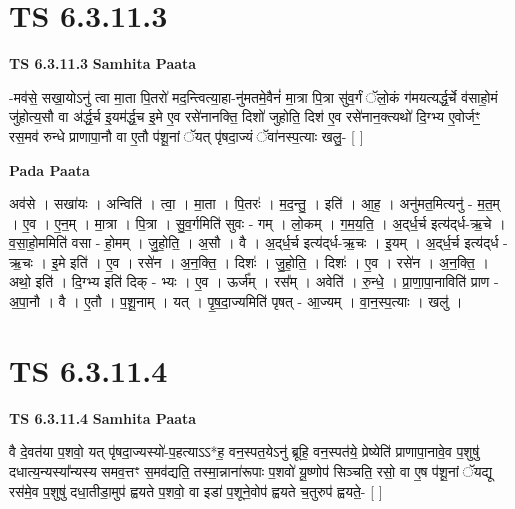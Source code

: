 \documentclass[17pt]{extarticle}
\begin{document}

\section{ TS 6.3.11.3 }

\textbf{TS 6.3.11.3 } \newline
\textbf{Samhita Paata} \newline

-मव॑से॒ सखा॒योऽनु॑ त्वा मा॒ता पि॒तरो॑ मद॒न्त्वित्या॒हा-नु॑मतमे॒वैनं॑ मा॒त्रा पि॒त्रा सु॑व॒र्गं ॅलो॒कं ग॑मयत्यर्द्ध॒र्चे व॑साहो॒मं जु॑होत्य॒सौ वा अ॑र्द्ध॒र्च इ॒यम॑र्द्ध॒च इ॒मे ए॒व रसे॑नानक्ति॒ दिशो॑ जुहोति॒ दिश॑ ए॒व रसे॑नान॒क्त्यथो॑ दि॒ग्भ्य ए॒वोर्जꣳ॒॒ रस॒मव॑ रुन्धे प्राणापा॒नौ वा ए॒तौ प॑शू॒नां ॅयत् पृ॑षदा॒ज्यं ॅवा॑नस्प॒त्याः खलु॒- [  ] \newline

\textbf{Pada Paata} \newline

अव॑से । सखा॑यः । अन्विति॑ । त्वा॒ । मा॒ता । पि॒तरः॑ । म॒द॒न्तु॒ । इति॑ । आ॒ह॒ । अनु॑मत॒मित्यनु॑ - म॒त॒म् । ए॒व । ए॒न॒म् । मा॒त्रा । पि॒त्रा । सु॒व॒र्गमिति॑ सुवः - गम् । लो॒कम् । ग॒म॒य॒ति॒ । अ॒द्‌र्ध॒र्च इत्य॑द्‌र्ध-ऋ॒चे । व॒सा॒हो॒ममिति॑ वसा - हो॒मम् । जु॒हो॒ति॒ । अ॒सौ । वै । अ॒द्‌र्ध॒र्च इत्य॑द्‌र्ध-ऋ॒चः । इ॒यम् । अ॒द्‌र्ध॒र्च इत्य॑द्‌र्ध - ऋ॒चः । इ॒मे इति॑ । ए॒व । रसे॑न । अ॒न॒क्ति॒ । दिशः॑ । जु॒हो॒ति॒ । दिशः॑ । ए॒व । रसे॑न । अ॒न॒क्ति॒ । अथो॒ इति॑ । दि॒ग्भ्य इति॑ दिक् - भ्यः । ए॒व । ऊर्ज᳚म् । रस᳚म् । अवेति॑ । रु॒न्धे॒ । प्रा॒णा॒पा॒नाविति॑ प्राण - अ॒पा॒नौ । वै । ए॒तौ । प॒शू॒नाम् । यत् । पृ॒ष॒दा॒ज्यमिति॑ पृषत् - आ॒ज्यम् । वा॒न॒स्प॒त्याः । खलु॑ ।  \newline





\section{ TS 6.3.11.4 }

\textbf{TS 6.3.11.4 } \newline
\textbf{Samhita Paata} \newline

वै दे॒वत॑या प॒शवो॒ यत् पृ॑षदा॒ज्यस्यो॑-प॒हत्याऽऽ*ह॒ वन॒स्पत॒येऽनु॑ ब्रूहि॒ वन॒स्पत॑ये॒ प्रेष्येति॑ प्राणापा॒नावे॒व प॒शुषु॑ दधात्य॒न्यस्या᳚न्यस्य समव॒त्तꣳ स॒मव॑द्यति॒ तस्मा॒न्नाना॑रूपाः प॒शवो॑ यू॒ष्णोप॑ सिञ्चति॒ रसो॒ वा ए॒ष प॑शू॒नां ॅयद्यू रस॑मे॒व प॒शुषु॑ दधा॒तीडा॒मुप॑ ह्वयते प॒शवो॒ वा इडा॑ प॒शूने॒वोप॑ ह्वयते च॒तुरुप॑ ह्वयते॒- [  ] \newline
\end{document}
